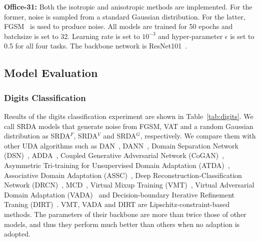 \documentclass[journal,twocolumn]{IEEEtran}
\theoremstyle{definition}
\begin{document}
{\bf Office-31:}  Both the isotropic and anisotropic methods are implemented. For the former, noise is sampled from a standard Gaussian distribution. For the latter, FGSM~\cite{goodfellow2014explaining} is used to produce noise. All models are trained for 50 epochs and batchsize is set to 32. Learning rate is set to $10^{-3}$ and hyper-parameter $\epsilon$ is set to 0.5 for all four tasks.  The backbone network is ResNet101~\cite{7780459}.

\subsection{Model Evaluation}

\subsubsection{Digits Classification}
Results of the digits classification experiment are shown in Table~\ref{tab:digits}. We call SRDA models that generate noise from FGSM, VAT and a random Gaussian distribution as SRDA$^F$, SRDA$^V$ and SRDA$^G$, respectively.  We compare them with other UDA algorithms such as DAN~\cite{pmlr-v37-long15}, DANN~\cite{ganin2016domain}, Domain Separation Network (DSN)~\cite{NIPS2016_6254}, ADDA~\cite{tzeng2017adversarial}, Coupled Generative Adversarial Network (CoGAN)~\cite{liu2016coupled}, Asymmetric Tri-training for Unsupervised Domain Adaptation (ATDA)~\cite{pmlr-v70-saito17a}, Associative Domain Adaptation (ASSC)~\cite{Haeusser_2017_ICCV}, Deep Reconstruction-Classification Network (DRCN)~\cite{DBLP:conf/eccv/GhifaryKZBL16}, MCD~\cite{saito2018maximum}, Virtual Mixup Training (VMT)~\cite{mao2019virtual}, Virtual Adversarial Domain Adaptation (VADA)~\cite{shu2018a} and Decision-boundary Iterative Refinement Traning (DIRT)~\cite{shu2018a}. VMT, VADA and DIRT are Lipschitz-constraint-based methods. The parameters of their backbone are more than twice those of other models, and thus they perform much better than others when no adaption is adopted. 
\end{document}
